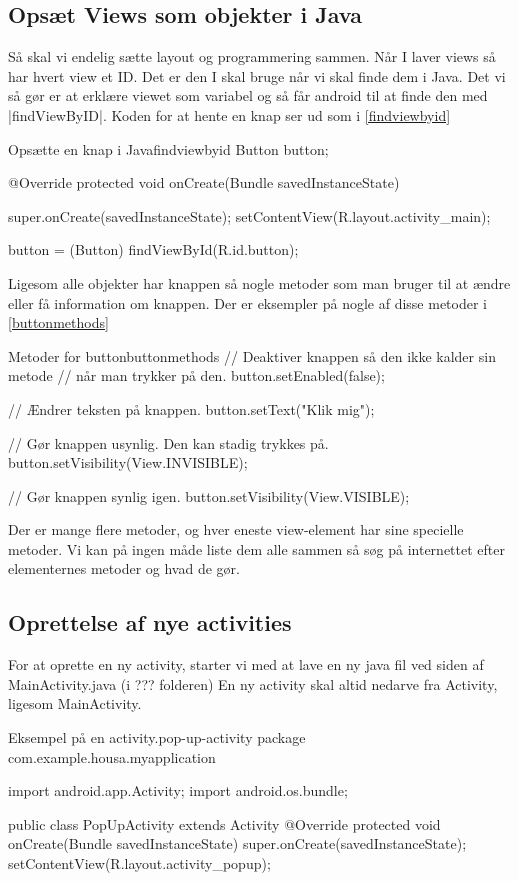 \subsection{Opsæt Views som objekter i Java}
Så skal vi endelig sætte layout og programmering sammen. Når I laver views så har hvert view et ID. Det er den I skal bruge når vi skal finde dem i Java. Det vi så gør er at erklære viewet som variabel og så får android til at finde den med \JavaInline|findViewByID|. Koden for at hente en knap ser ud som i \autoref{findviewbyid}

\begin{JavaCode}{Opsætte en knap i Java}{findviewbyid}
	Button button;
	
	@Override
	protected void onCreate(Bundle savedInstanceState) {
		super.onCreate(savedInstanceState);
		setContentView(R.layout.activity_main);
		
		button = (Button) findViewById(R.id.button);
	}
\end{JavaCode}

Ligesom alle objekter har knappen så nogle metoder som man bruger til at ændre eller få information om knappen. Der er eksempler på nogle af disse metoder i \autoref{buttonmethods}
\begin{JavaCode}{Metoder for button}{buttonmethods}
	// Deaktiver knappen så den ikke kalder sin metode 
	// når man trykker på den.
	button.setEnabled(false);
	
	// Ændrer teksten på knappen.
	button.setText("Klik mig");
	
	// Gør knappen usynlig. Den kan stadig trykkes på.	
	button.setVisibility(View.INVISIBLE);
	
	// Gør knappen synlig igen.
	button.setVisibility(View.VISIBLE);
\end{JavaCode}
Der er mange flere metoder, og hver eneste view-element har sine specielle metoder. Vi kan på ingen måde liste dem alle sammen så søg på internettet efter elementernes metoder og hvad de gør. 


\subsection{Oprettelse af nye activities}

For at oprette en ny activity, starter vi med at lave en ny java fil ved siden af MainActivity.java (i ??? folderen) En ny activity skal altid nedarve fra Activity, ligesom MainActivity. 

\begin{JavaCode}{Eksempel på en activity.}{pop-up-activity}
	package com.example.housa.myapplication
	
	import android.app.Activity;
	import android.os.bundle;
	
	public class PopUpActivity extends Activity {
		@Override
		protected void onCreate(Bundle savedInstanceState) {
			super.onCreate(savedInstanceState);
			setContentView(R.layout.activity_popup);
		}
	}
\end{JavaCode}

